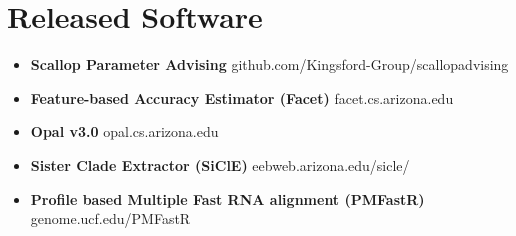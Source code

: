 \documentclass[10pt,letterpaper]{article}
\begin{document}
\section*{Released Software}
\begin{itemize}[leftmargin=*,labelindent=5pt,itemindent=-15pt]
\item \textbf{Scallop Parameter Advising}						github.com/Kingsford-Group/scallopadvising
\item \textbf{Feature-based Accuracy Estimator (Facet)} 			facet.cs.arizona.edu
\item \textbf{Opal v3.0}										opal.cs.arizona.edu 
\item \textbf{Sister Clade Extractor (SiClE)}						eebweb.arizona.edu/sicle/
\item \textbf{Profile based Multiple Fast RNA alignment (PMFastR)}	genome.ucf.edu/PMFastR 
\end{itemize}
\end{document}
